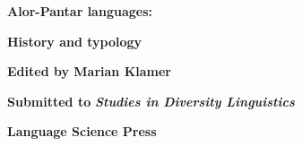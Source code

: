 \documentclass[a4paper]{article}
\title{}
\author{* *}
\date{2014-01-11}
\begin{document}
\clearpage\setcounter{page}{1}\pagestyle{Standard}
{\centering
\textbf{Alor-Pantar languages:}
\par}

{\centering
\textbf{History and typology}
\par}

{\centering
\textbf{Edited by Marian Klamer}
\par}

{\centering
\textbf{Submitted to }\textbf{\textit{Studies in Diversity Linguistics }}
\par}

{\centering
\textbf{Language Science Press}
\par}
\end{document}
